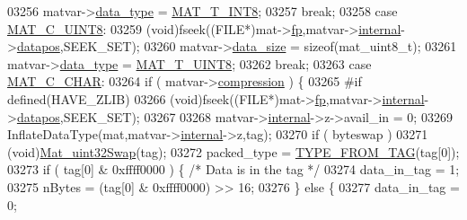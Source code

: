 \begin{DoxyCode}
{{{{{{{{{{{{{{{{03256             matvar->\hyperlink{group___m_a_t_ab6aafe9bd77f0f077852593dec438144}{data\_type} = \hyperlink{group___m_a_t_ggacf7b3b879282b7ab3a51190e49bf3453a9807f5033ed4f9b548953742d9fd1658}{MAT\_T\_INT8};
03257             \textcolor{keywordflow}{break};
03258         \textcolor{keywordflow}{case} \hyperlink{group___m_a_t_ggad4d60ae7b709fc81bfd744fb4c857c40a81270f8093cb4808e992c1d29d84d4e3}{MAT\_C\_UINT8}:
03259             (void)fseek((FILE*)mat->\hyperlink{struct__mat__t_a85f562e407ca9ad4d2a6e14f839432b7}{fp},matvar->\hyperlink{group___m_a_t_a6e97e3ed9f40c49322c18561c2a94e92}{internal}->\hyperlink{structmatvar__internal_afd3bfaab126a160bd6855563e1ea0a7e}{datapos},SEEK\_SET);
03260             matvar->\hyperlink{group___m_a_t_a9ad1c82e2b568da617e12dc73a26e1f9}{data\_size} = \textcolor{keyword}{sizeof}(mat\_uint8\_t);
03261             matvar->\hyperlink{group___m_a_t_ab6aafe9bd77f0f077852593dec438144}{data\_type} = \hyperlink{group___m_a_t_ggacf7b3b879282b7ab3a51190e49bf3453a01c1bd7db68f90552862eb5d311be408}{MAT\_T\_UINT8};
03262             \textcolor{keywordflow}{break};
03263         \textcolor{keywordflow}{case} \hyperlink{group___m_a_t_ggad4d60ae7b709fc81bfd744fb4c857c40aacdec5834df0861130b393697646119c}{MAT\_C\_CHAR}:
03264             \textcolor{keywordflow}{if} ( matvar->\hyperlink{group___m_a_t_aeef0466048621cb2c959ba7f6c774d06}{compression} ) \{
03265 \textcolor{preprocessor}{#if defined(HAVE\_ZLIB)}
03266                 (void)fseek((FILE*)mat->\hyperlink{struct__mat__t_a85f562e407ca9ad4d2a6e14f839432b7}{fp},matvar->\hyperlink{group___m_a_t_a6e97e3ed9f40c49322c18561c2a94e92}{internal}->\hyperlink{structmatvar__internal_afd3bfaab126a160bd6855563e1ea0a7e}{datapos},SEEK\_SET);
03267 
03268                 matvar->\hyperlink{group___m_a_t_a6e97e3ed9f40c49322c18561c2a94e92}{internal}->z->avail\_in = 0;
03269                 InflateDataType(mat,matvar->\hyperlink{group___m_a_t_a6e97e3ed9f40c49322c18561c2a94e92}{internal}->z,tag);
03270                 \textcolor{keywordflow}{if} ( byteswap )
03271                     (void)\hyperlink{endian_8c_a8cb0d0750e2eaf9840d95db531934f4f}{Mat\_uint32Swap}(tag);
03272                 packed\_type = \hyperlink{mat5_8c_a82bacecc4afc633b61bc3dc8ef88d1ed}{TYPE\_FROM\_TAG}(tag[0]);
03273                 \textcolor{keywordflow}{if} ( tag[0] & 0xffff0000 ) \{ \textcolor{comment}{/* Data is in the tag */}
03274                     data\_in\_tag = 1;
03275                     nBytes = (tag[0] & 0xffff0000) >> 16;
03276                 \} \textcolor{keywordflow}{else} \{
03277                     data\_in\_tag = 0;
}}}}}}}}}}}}}}}}
\end{DoxyCode}
